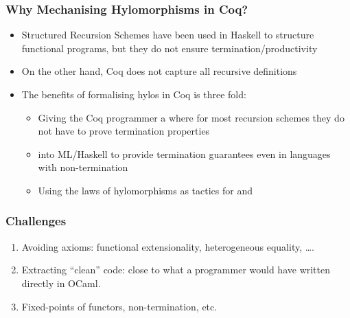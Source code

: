 \begin{frame}
  \frametitle{Why Mechanising Hylomorphisms in Coq?}

  \begin{itemize}
    \item Structured Recursion Schemes have been used in Haskell to structure
      functional programs, but they do not ensure termination/productivity
    \item On the other hand, Coq does not capture all recursive definitions
    \item The benefits of formalising hylos in Coq is three fold:
      \begin{itemize}
        \item Giving the Coq programmer a  where for most
          recursion schemes they do not have to prove termination properties
        \item {} into ML/Haskell to provide termination
          guarantees even in languages with non-termination
        \item Using the laws of hylomorphisms as tactics for  and 
      \end{itemize}
  \end{itemize}
\end{frame}

\begin{frame}
  \frametitle{Challenges}
  \begin{enumerate}
    \item Avoiding axioms: functional extensionality, heterogeneous equality,
      \ldots.
    \item Extracting ``clean'' code: close to what a programmer would have
      written directly in OCaml.
    \item Fixed-points of functors, non-termination, etc.
  \end{enumerate}

  \vspace{.5cm}
  
\end{frame}


